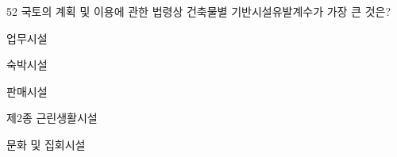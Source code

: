 \begin{question}{52}
국토의 계획 및 이용에 관한 법령상 건축물별 기반시설유발계수가 가장 큰 것은?
\begin{choices}
  \item 업무시설
  \item 숙박시설
  \item 판매시설
  \item 제2종 근린생활시설
  \item 문화 및 집회시설
\end{choices}
\end{question}
